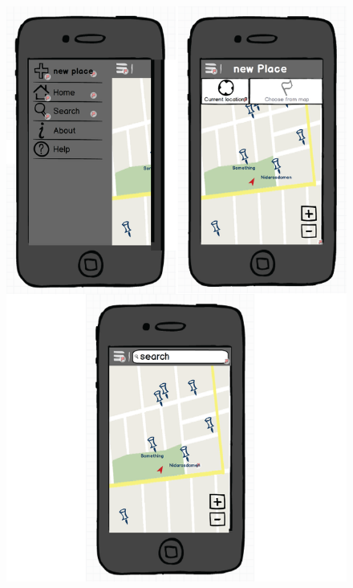 \documentclass[12pt,a4paper,titlepage]{article}
\begin{document}
\begin{appendices}
\begin{figure}[!h]
\centering
\includegraphics[width=0.9 \textwidth] {res/mockup3.png}
\end{figure}


\end{appendices}
\end{document}
